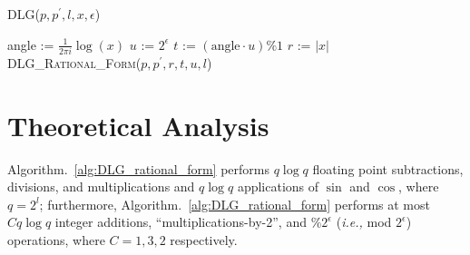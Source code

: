 \documentclass[sigconf]{acmart}
\begin{document}
\begin{algorithm}
\caption{\textsc{DLG}($p,p^\prime,l,x, \epsilon$)}
\label{alg:rational_angle_approx}
\begin{algorithmic}
\STATE angle     := $\frac{1}{2\pi i} \log (x)$
\STATE $u $    := $2^{\epsilon}$
\STATE$t$      :=  $(\text{angle} \cdot u)\% 1$
\STATE $r$      := $|x|$
\RETURN \textsc{DLG\_Rational\_Form}($p,p^\prime,r,t,u,l$)
\end{algorithmic}
\end{algorithm}

%












\section{Theoretical Analysis}
\begin{theorem}
Algorithm.~\ref{alg:DLG_rational_form} performs $q \log q$ floating point subtractions, divisions, and multiplications and $q \log q$ applications of $\sin$ and $\cos$, where $q = 2^l$; furthermore, Algorithm.~\ref{alg:DLG_rational_form} performs at most $Cq \log q$  integer additions, ``multiplications-by-2'', and $ \%2^\epsilon $ (\emph{i.e.,} mod $ 2^\epsilon $) operations, where $C=1,3,2$ respectively.
\end{theorem}
\end{document}
